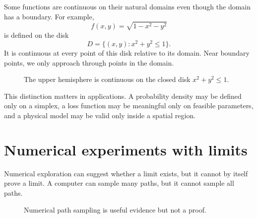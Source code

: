 \documentclass[11pt]{article}
\begin{document}
Some functions are continuous on their natural domains even though the domain has a boundary. For example,
\[
f(x,y)=\sqrt{1-x^2-y^2}
\]
is defined on the disk
\[
D=\{(x,y):x^2+y^2\le1\}.
\]
It is continuous at every point of this disk relative to its domain. Near boundary points, we only approach through points in the domain.

\begin{figure}[H]
\centering
{}
\caption{The upper hemisphere is continuous on the closed disk $x^2+y^2\le1$.}
\end{figure}

This distinction matters in applications. A probability density may be defined only on a simplex, a loss function may be meaningful only on feasible parameters, and a physical model may be valid only inside a spatial region.

\section{Numerical experiments with limits}

Numerical exploration can suggest whether a limit exists, but it cannot by itself prove a limit. A computer can sample many paths, but it cannot sample all paths.

\begin{figure}[H]
\centering
{}
\caption{Numerical path sampling is useful evidence but not a proof.}
\end{figure}
\end{document}
